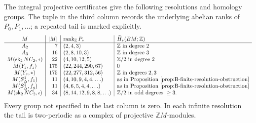 \begin{proposition}\label{prop:B-resolutions}
The integral projective certificates give the following resolutions and
homology groups.  The tuple in the third column records the underlying
abelian ranks of $P_0,P_1,\ldots$; a repeated tail is marked explicitly.
\[
\begin{array}{c|r|l|l}
M&|M|&\operatorname{rank}_{\mathbb Z}P_*&\widetilde H_*(BM;\mathbb Z)\\ \hline
A_2&7&(2,4,3)&\mathbb Z\text{ in degree }2\\
A_3&16&(2,8,10,3)&\mathbb Z\text{ in degree }3\\
M(\operatorname{sk}_2NC_2,*)&22&(4,10,12,5)&\mathbb Z/2\text{ in degree }2\\
M(Y_z,f_z)&175&(22,244,290,67)&0\\
M(Y_z,*)&175&(22,277,312,56)&\mathbb Z\text{ in degrees }2,3\\
M(S^1_\Delta,f_1)&11&(4,10,9,4,4,\ldots)&\text{as in Proposition~\ref{prop:B-finite-resolution-obstruction}}\\
M(S^1_\Delta,f_g)&11&(4,6,5,4,4,\ldots)&\text{as in Proposition~\ref{prop:B-finite-resolution-obstruction}}\\
M(\operatorname{sk}_2NC_2,\iota)&34&(8,14,12,9,8,8,\ldots)&\mathbb Z/2\text{ in odd degrees }\ge3 .
\end{array}
\]
Every group not specified in the last column is zero.  In each infinite
resolution the tail is two-periodic as a complex of projective
$\mathbb ZM$-modules.
\end{proposition}

